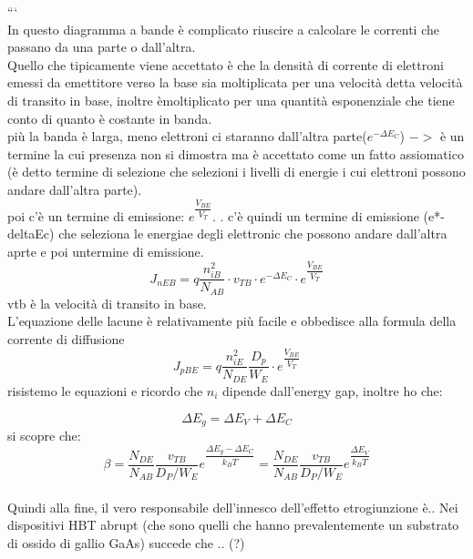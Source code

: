 ```%
\\
In questo diagramma a bande è complicato riuscire a calcolare le correnti che passano da una parte o dall'altra.\\
Quello che tipicamente viene accettato è che la densità di corrente di elettroni emessi da emettitore verso la base sia moltiplicata per una velocità detta velocità di transito in base, inoltre èmoltiplicato per una quantità esponenziale che tiene conto di quanto è costante in banda.\\
più la banda è larga, meno elettroni ci staranno dall'altra parte($e^{-\Delta E_C}$) $->$ è un termine la cui presenza non si dimostra ma è accettato come un fatto assiomatico (è detto termine di selezione che selezioni i livelli di energie i cui elettroni possono andare dall'altra parte).\\
poi c'è un termine di emissione: $ e^{\dfrac{V_{BE}}{V_T}}$.
.
c'è quindi un termine di emissione (e*-deltaEc) che seleziona le energiae degli elettronic che possono andare dall'altra aprte e poi untermine di emissione.
\begin{equation}
    J_{nEB} = q \dfrac{n_{iB}^2}{N_{AB}} \cdot v_{TB} \cdot e^{-\Delta E_C} \cdot e^{\dfrac{V_{BE}}{V_T}} 
\end{equation}
vtb è la velocità di transito in base.\\

L'equazione delle lacune è relativamente più facile e obbedisce alla formula della corrente di diffusione
\begin{equation}
    J_{pBE} = q \dfrac{n_{iE}^2}{N_{DE}} \dfrac{D_p}{W_E} \cdot e^{\dfrac{V_{BE}}{V_T}}
\end{equation}
risistemo le equazioni e ricordo che $n_i$ dipende dall'energy gap, inoltre ho che:

\begin{equation}
    \Delta E_g = \Delta E_V + \Delta E_C
\end{equation}
si scopre che:
\begin{equation}
    \beta = \dfrac{N_{DE}}{N_{AB}} \dfrac{v_{TB}}{D_P/W_E} e^{\dfrac{\Delta E_g - \Delta E_C}{k_B T}}=\dfrac{N_{DE}}{N_{AB}} \dfrac{v_{TB}}{D_P/W_E} e^{\dfrac{\Delta E_V}{k_B T}}
\end{equation}\\
Quindi alla fine, il vero responsabile dell'innesco dell'effetto etrogiunzione è..
Nei dispositivi HBT abrupt (che sono quelli che hanno prevalentemente un substrato di ossido di gallio GaAs) succede che .. (?)

